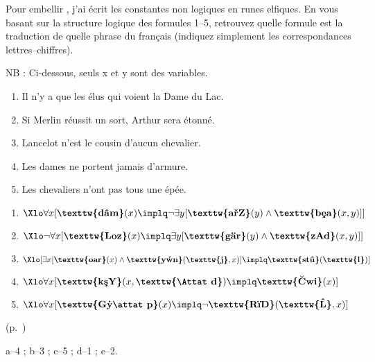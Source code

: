 \begin{exo}\label{e:elf}
Pour embellir {\LO}, j'ai écrit les constantes non logiques en runes elfiques.
%
En vous basant sur la structure logique des formules 1--5, retrouvez quelle formule est la traduction de quelle phrase du français (indiquez simplement les correspondances lettres--chiffres).

NB : Ci-dessous, seuls \vrb x et \vrb y sont des variables.
\newcommand{\cnelf}[1]{\ensuremath{\textbf{\texttw{#1}}}}

\hspace{-2cm}
\begin{minipage}[t]{.55\textwidth}
\begin{enumerate}[label=\alph*.]
\item Il n'y a que les élus qui voient la Dame du Lac.
\item Si Merlin réussit un sort, Arthur sera étonné.
\item Lancelot n'est le cousin d'aucun chevalier.
\item Les dames ne portent jamais d'armure.
\item Les chevaliers n'ont pas tous une épée.
\end{enumerate}
\end{minipage}
\begin{minipage}[t]{.6\textwidth}
\begin{enumerate}
\item \(\Xlo \forall x [\cnelf{d\^am}(x) \implq \neg\exists y[\cnelf{a\v rZ}(y) \wedge \cnelf{b\c{e}a}(x,y)]]\)
\item \(\Xlo\neg\forall x [\cnelf{Loz}(x) \implq \exists y[\cnelf{g\"ar}(y) \wedge \cnelf{zAd}(x,y)]]\)
\item \(\Xlo [\exists x [\cnelf{oar}(x) \wedge \cnelf{y\'wn}(\cnelf j,x)] \implq \cnelf{st\^u}(\cnelf l)]\)
\item
\(\Xlo \forall x [\cnelf{k\c sY}(x,\cnelf{\Attat d}) \implq \cnelf{\u Cwi}(x)]\)
\item
\(\Xlo \forall x [\cnelf{G\.y\attat p}(x) \implq \neg \cnelf{R\"iD}(\cnelf{\^L},x)]\)
\end{enumerate}
\end{minipage}

\begin{solu}(p.~\pageref{e:elf})\label{crg:elf}

a--4 ; b--3 ; c--5 ; d--1 ; e--2.
\end{solu}
\end{exo}
